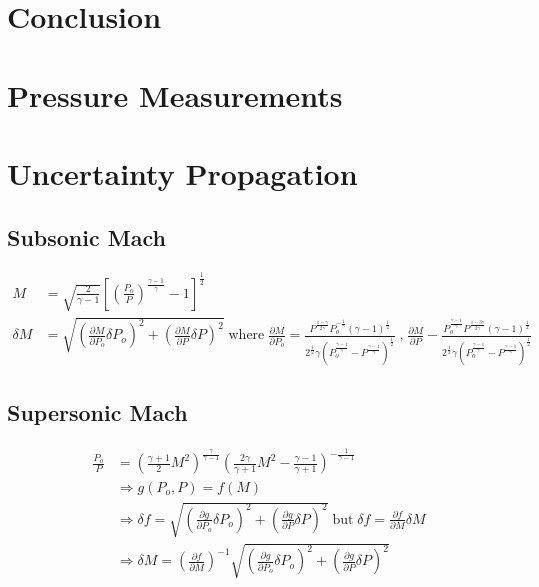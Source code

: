 \documentclass[runningheads]{llncs}
\begin{document}


\section{Conclusion}










\appendix

\section{Pressure Measurements}

\section{Uncertainty Propagation}

\subsection{Subsonic Mach}

\begin{align*}
    M &= \sqrt{\frac{2}{\gamma - 1}}\left[\left(\frac{P_o}{P}\right)^\frac{\gamma - 1}{\gamma} - 1\right]^{\frac{1}{2}} \\
    \delta M &= \sqrt{\left(\frac{\partial M}{\partial P_o}\delta P_o\right)^2 + \left(\frac{\partial M}{\partial P}\delta P\right)^2}\;\text{where}\;
    \frac{\partial M}{\partial P_o} = \frac{P^\frac{1 - \gamma}{2\gamma}P_o^{- \frac{1}{\gamma}}(\gamma - 1)^\frac{1}{2}}{2^\frac{1}{2}\gamma\left(P_o^\frac{\gamma - 1}{\gamma} - P^\frac{\gamma - 1}{\gamma}\right)^\frac{1}{2}}\;\text{,}\;\frac{\partial M}{\partial P} -\frac{P_o^\frac{\gamma - 1}{\gamma}P^\frac{1 - 3\gamma}{2\gamma}(\gamma - 1)^\frac{1}{2}}{2^\frac{1}{2}\gamma\left(P_o^\frac{\gamma - 1}{\gamma} - P^\frac{\gamma - 1}{\gamma}\right)^\frac{1}{2}}
\end{align*}

\subsection{Supersonic Mach}

\begin{align*}
    \frac{P_o}{P} &= \left(\frac{\gamma + 1}{2}M^2\right)^{\frac{\gamma}{\gamma - 1}}\left(\frac{2\gamma}{\gamma + 1}M^2 - \frac{\gamma - 1}{\gamma + 1}\right)^{-\frac{1}{\gamma - 1}} \\
    &\Rightarrow g(P_o, P) = f(M) \\
    &\Rightarrow \delta f = \sqrt{\left(\frac{\partial g}{\partial P_o}\delta P_o\right)^2 + \left(\frac{\partial g}{\partial P}\delta P\right)^2}\;\text{but}\;\delta f = \frac{\partial f}{\partial M} \delta M \\
    &\Rightarrow \delta M = \left(\frac{\partial f}{\partial M}\right)^{-1}\sqrt{\left(\frac{\partial g}{\partial P_o}\delta P_o\right)^2 + \left(\frac{\partial g}{\partial P}\delta P\right)^2}
\end{align*}
\end{document}
